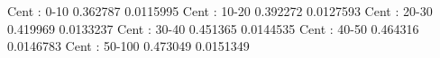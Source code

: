 Cent : 0-10
0.362787 0.0115995
Cent : 10-20
0.392272 0.0127593
Cent : 20-30
0.419969 0.0133237
Cent : 30-40
0.451365 0.0144535
Cent : 40-50
0.464316 0.0146783
Cent : 50-100
0.473049 0.0151349
